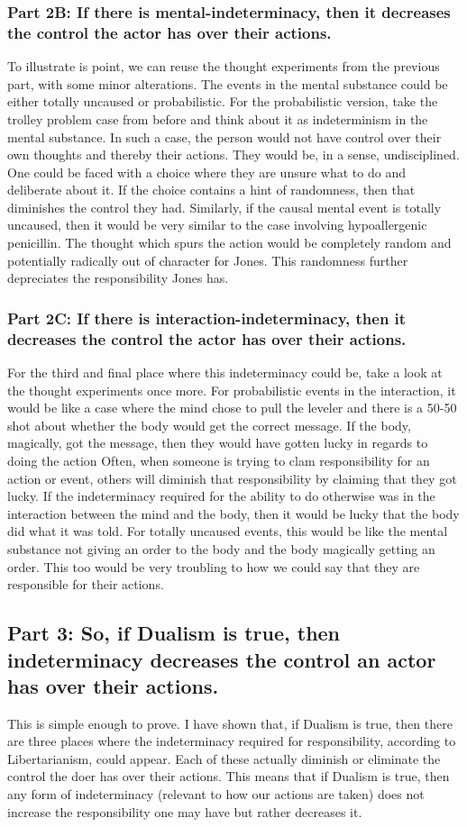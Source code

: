\subsubsection{Part 2B: If there is mental-indeterminacy, then it decreases the control the actor has over their actions.}
To illustrate is point, we can reuse the thought experiments from the previous part, with some minor alterations. The events in the mental substance could be either totally uncaused or probabilistic. For the probabilistic version, take the trolley problem case from before and think about it as indeterminism in the mental substance. In such a case, the person would not have control over their own thoughts and thereby their actions. They would be, in a sense, undisciplined. One could be faced with a choice where they are unsure what to do and deliberate about it. If the choice contains a hint of randomness, then that diminishes the control they had. Similarly, if the causal mental event is totally uncaused, then it would be very similar to the case involving hypoallergenic penicillin. The thought which spurs the action would be completely random and potentially radically out of character for Jones. This randomness further depreciates the responsibility Jones has. 

\subsubsection{Part 2C: If there is interaction-indeterminacy, then it decreases the control the actor has over their actions.} 
For the third and final place where this indeterminacy could be, take a look at the thought experiments once more. For probabilistic events in the interaction, it would be like a case where the mind chose to pull the leveler and there is a 50-50 shot about whether the body would get the correct message. If the body, magically, got the message, then they would have gotten lucky in regards to doing the action Often, when someone is trying to clam responsibility for an action or event, others will diminish that responsibility by claiming that they got lucky. If the indeterminacy required for the ability to do otherwise was in the interaction between the mind and the body, then it would be lucky that the body did what it was told. For totally uncaused events, this would be like the mental substance not giving an order to the body and the body magically getting an order. This too would be very troubling to how we could say that they are responsible for their actions. 
\subsection{Part 3: So, if Dualism is true, then indeterminacy decreases the control an actor has over their actions.}
This is simple enough to prove. I have shown that, if Dualism is true, then there are three places where the indeterminacy required for responsibility, according to Libertarianism, could appear. Each of these actually diminish or eliminate the control the doer has over their actions. This means that if Dualism is true, then any form of indeterminacy (relevant to how our actions are taken) does not increase the responsibility one may have but rather decreases it.
